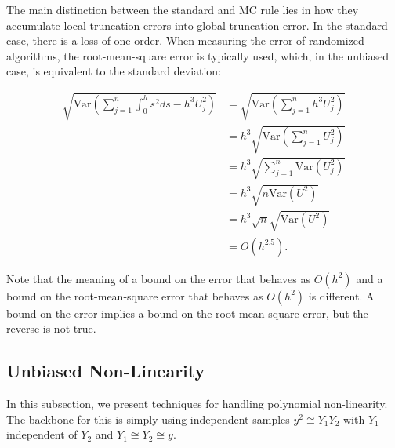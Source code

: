 \documentclass[a4paper,12pt]{article}
\begin{document}
The main distinction between the standard and MC rule lies in how they
accumulate local truncation errors into global truncation error. In the standard
case, there is a loss of one order. When measuring the error of randomized algorithms,
the root-mean-square error is typically used, which, in the unbiased case,
is equivalent to the standard deviation:

\begin{align}
    \sqrt{\text{Var}\left(\sum_{j=1}^{n} \int_{0}^{h} s^{2}ds- h^{3}U_{j}^{2}\right)}
     & =\sqrt{\text{Var}\left(\sum_{j=1}^{n} h^{3}U_{j}^{2}\right)}   \\
     & =h^{3} \sqrt{\text{Var}\left( \sum_{j=1}^{n} U_{j}^{2}\right)} \\
     & =h^{3} \sqrt{ \sum_{j=1}^{n}\text{Var} (U_{j}^{2})}            \\
     & =h^{3} \sqrt{ n \text{Var}(U^{2})}                             \\
     & =h^{3} \sqrt{n} \sqrt{ \text{Var}(U^{2})}                      \\
     & = O(h^{2.5}).
\end{align}

Note that the meaning of a bound on the error that behaves as $O(h^{2})$ and
a bound on the root-mean-square error that behaves as $O(h^{2})$ is different.
A bound on the error implies a bound on the root-mean-square error, but
the reverse is not true.

\subsection{Unbiased Non-Linearity}

In this subsection, we present techniques for handling polynomial non-linearity.
The backbone for this is simply using independent samples
$y^{2} \cong Y_{1} Y_{2}$ with $Y_{1}$ independent of $ Y_{2}$ and
$Y_{1} \cong Y_{2} \cong y$.
\end{document}
